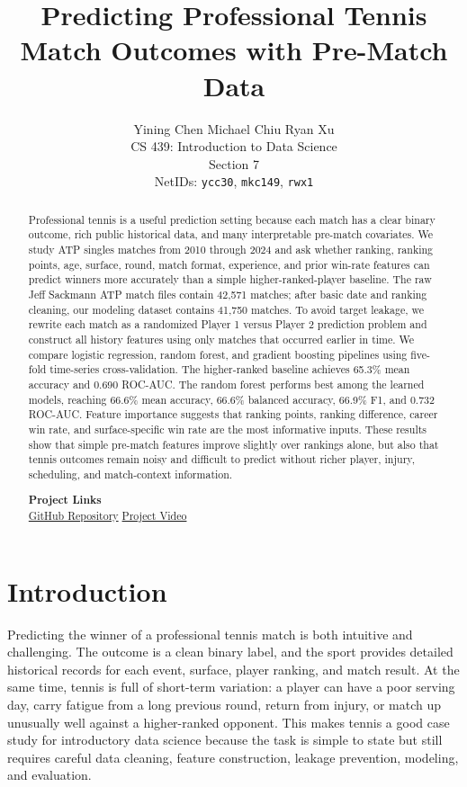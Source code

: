 \documentclass{article}
\title{Predicting Professional Tennis Match Outcomes with Pre-Match Data}
\author{%
  Yining Chen \quad Michael Chiu \quad Ryan Xu\\
  CS 439: Introduction to Data Science\\
  Section 7\\
  NetIDs: \texttt{ycc30}, \texttt{mkc149}, \texttt{rwx1}
}
\begin{document}
\maketitle

\begin{abstract}
Professional tennis is a useful prediction setting because each match has a clear binary outcome, rich public historical data, and many interpretable pre-match covariates. We study ATP singles matches from 2010 through 2024 and ask whether ranking, ranking points, age, surface, round, match format, experience, and prior win-rate features can predict winners more accurately than a simple higher-ranked-player baseline. The raw Jeff Sackmann ATP match files contain 42,571 matches; after basic date and ranking cleaning, our modeling dataset contains 41,750 matches. To avoid target leakage, we rewrite each match as a randomized Player 1 versus Player 2 prediction problem and construct all history features using only matches that occurred earlier in time. We compare logistic regression, random forest, and gradient boosting pipelines using five-fold time-series cross-validation. The higher-ranked baseline achieves 65.3\% mean accuracy and 0.690 ROC-AUC. The random forest performs best among the learned models, reaching 66.6\% mean accuracy, 66.6\% balanced accuracy, 66.9\% F1, and 0.732 ROC-AUC. Feature importance suggests that ranking points, ranking difference, career win rate, and surface-specific win rate are the most informative inputs. These results show that simple pre-match features improve slightly over rankings alone, but also that tennis outcomes remain noisy and difficult to predict without richer player, injury, scheduling, and match-context information.

\begin{center}
\vspace{0.4em}
{\small\textbf{Project Links}\\[0.2em]
\href{https://github.com/wekantakabotdis/CS439-Project}{GitHub Repository}
\hspace{2em}
\href{https://www.youtube.com/watch?v=aPlrV3W4zwg}{Project Video}}
\end{center}
\end{abstract}

\section{Introduction}

Predicting the winner of a professional tennis match is both intuitive and challenging. The outcome is a clean binary label, and the sport provides detailed historical records for each event, surface, player ranking, and match result. At the same time, tennis is full of short-term variation: a player can have a poor serving day, carry fatigue from a long previous round, return from injury, or match up unusually well against a higher-ranked opponent. This makes tennis a good case study for introductory data science because the task is simple to state but still requires careful data cleaning, feature construction, leakage prevention, modeling, and evaluation.
\end{document}
